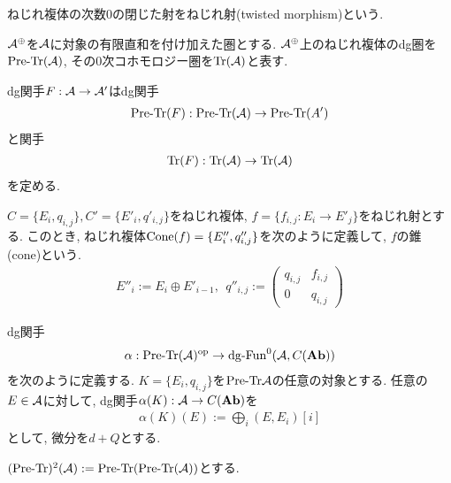 \documentclass[uplatex, a4paper, 14Q, dvipdfmx]{jsarticle}
\begin{document}
\begin{definition}
  ねじれ複体の次数$0$の閉じた射をねじれ射(twisted morphism)という.
\end{definition}   

$\mathcal{A}^\oplus$を$\mathcal{A}$に対象の有限直和を付け加えた圏とする. 
$\mathcal{A}^\oplus$上のねじれ複体のdg圏を$\mathrm{Pre} \text{-} \mathrm{Tr}(\mathcal{A})$, その$0$次コホモロジー圏を$\mathrm{Tr}(\mathcal{A})$と表す. 

\begin{lemma}
  dg関手$F : \mathcal{A} \to \mathcal{A}'$はdg関手
  \begin{align*}
    \mathrm{Pre} \text{-} \mathrm{Tr}(F) : \mathrm{Pre} \text{-} \mathrm{Tr}(\mathcal{A}) \to \mathrm{Pre} \text{-} \mathrm{Tr}(A')
  \end{align*}
  と関手
  \begin{align*}
    \mathrm{Tr}(F) : \mathrm{Tr}(\mathcal{A}) \to \mathrm{Tr}(\mathcal{A})
  \end{align*}
  を定める. 
\end{lemma}


\begin{definition}[シフト]
  
\end{definition}

\begin{definition}[錐]
  $C = \{E_i, q_{i,j}\}, C'=\{E'_i, q'_{i,j}\}$をねじれ複体, $f = \{f_{i,j} : E_i \to E'_j\}$をねじれ射とする. 
  このとき, ねじれ複体$\mathrm{Cone}({f}) = \{E''_i, q''_{i,j}\}$を次のように定義して, $f$の錐(cone)という.
  \begin{align*}
    E''_i := E_i \oplus E'_{i-1}, ~~ 
    q''_{i,j} := 
    \begin{pmatrix}
      q_{i,j} & f_{i,j} \\
      0       & q_{i,j}  
    \end{pmatrix} 
  \end{align*}
\end{definition}

\begin{definition}
  dg関手
  \begin{align*}
    \alpha : \mathrm{Pre} \text{-} \mathrm{Tr}(\mathcal{A})^{\mathrm{op}} \to \mathrm{dg}\text{-}\mathrm{Fun}^0(\mathcal{A},C(\mathbf{Ab}))
  \end{align*}
  を次のように定義する. 
  $K=\{E_i,q_{i,j}\}$を$\mathrm{Pre} \text{-} \mathrm{Tr}{\mathcal{A}}$の任意の対象とする.
  任意の$E \in \mathcal{A}$に対して, dg関手$\alpha(K) : \mathcal{A} \to C(\mathbf{Ab})$を
  \begin{align*}
    \alpha(K)(E) := \bigoplus_i(E,E_i)[i]
  \end{align*}
  として, 微分を$d+Q$とする. 
\end{definition}

$(\mathrm{Pre} \text{-} \mathrm{Tr})^2(\mathcal{A}) :=\mathrm{Pre} \text{-} \mathrm{Tr}(\mathrm{Pre} \text{-} \mathrm{Tr}(\mathcal{A}))$とする. 
\end{document}
